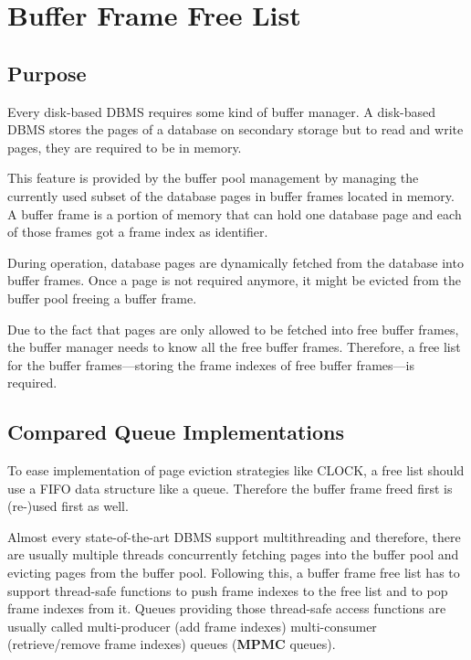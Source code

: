 \chapter[Buffer Frame Free List]{Buffer Frame Free List} \label{ch:free-list}

\section[Purpose]{Purpose}

    Every disk-based DBMS requires some kind of buffer manager. A disk-based DBMS stores the pages of a database on secondary storage but to read and write pages, they are required to be in memory.

    This feature is provided by the buffer pool management by managing the currently used subset of the database pages in buffer frames located in memory. A buffer frame is a portion of memory that can hold one database page and each of those frames got a frame index as identifier.

    During operation, database pages are dynamically fetched from the database into buffer frames. Once a page is not required anymore, it might be evicted from the buffer pool freeing a buffer frame.

    Due to the fact that pages are only allowed to be fetched into free buffer frames, the buffer manager needs to know all the free buffer frames. Therefore, a free list for the buffer frames---storing the frame indexes of free buffer frames---is required.

\section[Compared Queue Implementations]{Compared Queue Implementations}

    To ease implementation of page eviction strategies like CLOCK, a free list should use a FIFO data structure like a queue. Therefore the buffer frame freed first is (re-)used first as well.

    Almost every state-of-the-art DBMS support multithreading and therefore, there are usually multiple threads concurrently fetching pages into the buffer pool and evicting pages from the buffer pool. Following this, a buffer frame free list has to support thread-safe functions to push frame indexes to the free list and to pop frame indexes from it. Queues providing those thread-safe access functions are usually called multi-producer (add frame indexes) multi-consumer (retrieve/remove frame indexes) queues (\textbf{MPMC} queues).

